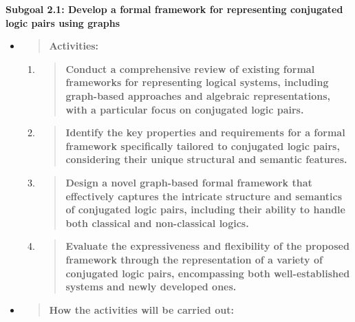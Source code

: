 \textbf{Subgoal 2.1: Develop a formal framework for representing
conjugated logic pairs using graphs}

\begin{itemize}
\item
  \begin{quote}
  \textbf{Activities:\\
  }
  \end{quote}

  \begin{enumerate}
  \def\labelenumi{\arabic{enumi}.}
  \item
    \begin{quote}
    \textbf{Conduct a comprehensive review of existing formal frameworks
    for representing logical systems, including graph-based approaches
    and algebraic representations, with a particular focus on conjugated
    logic pairs.\\
    }
    \end{quote}
  \item
    \begin{quote}
    \textbf{Identify the key properties and requirements for a formal
    framework specifically tailored to conjugated logic pairs,
    considering their unique structural and semantic features.\\
    }
    \end{quote}
  \item
    \begin{quote}
    \textbf{Design a novel graph-based formal framework that effectively
    captures the intricate structure and semantics of conjugated logic
    pairs, including their ability to handle both classical and
    non-classical logics.\\
    }
    \end{quote}
  \item
    \begin{quote}
    \textbf{Evaluate the expressiveness and flexibility of the proposed
    framework through the representation of a variety of conjugated
    logic pairs, encompassing both well-established systems and newly
    developed ones.\\
    }
    \end{quote}
  \end{enumerate}
\item
  \begin{quote}
  \textbf{How the activities will be carried out:\\
  }
  \end{quote}


\end{itemize}
